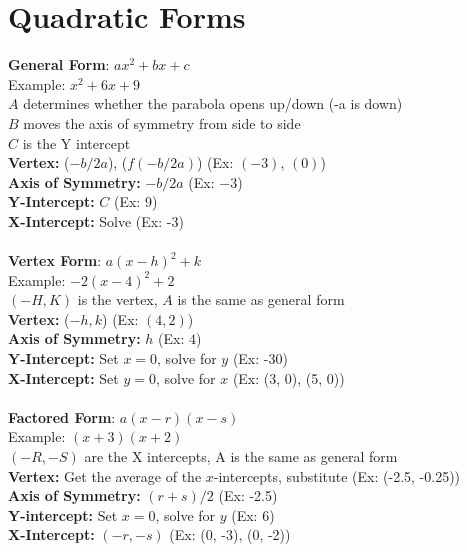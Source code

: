\documentclass{article}
\begin{document}
	\section*{Quadratic Forms}
	\textbf{General Form}: $ax^2 + bx + c$ \\
	Example: $x^2 + 6x + 9$ \\
	\textbf{$A$} determines whether the parabola opens up/down (-a is down)\\
	\textbf{$B$} moves the axis of symmetry from side to side\\
	\textbf{$C$} is the Y intercept\\ 
	\textbf{Vertex:} ($-b/2a$), ($f(-b/2a)$) (Ex: $(-3)$, $(0)$) \\
	\textbf{Axis of Symmetry:} $-b/2a$ (Ex: $-3$)\\
	\textbf{Y-Intercept:} $C$ (Ex: 9)\\
	\textbf{X-Intercept:} Solve (Ex: -3)\\ \\
	\textbf{Vertex Form}: $a(x-h)^2+k$ \\
	Example: $-2(x-4)^{2}+2$\\
	$(-H, K)$ is the vertex, $A$ is the same as general form \\ 
	\textbf{Vertex:} ($-h, k$) (Ex: $(4, 2)$)\\
	\textbf{Axis of Symmetry:} $h$ (Ex: $4$)\\
	\textbf{Y-Intercept:} Set $x=0$, solve for $y$ (Ex: -30) \\
	\textbf{X-Intercept:} Set $y=0$, solve for $x$ (Ex: (3, 0), (5, 0))\\ \\
	\textbf{Factored Form}: $a(x-r)(x-s)$ \\
	Example: $(x+3)(x+2)$ \\
	$(-R, -S)$ are the X intercepts, A is the same as general form \\ 
	\textbf{Vertex:} Get the average of the $x$-intercepts, substitute (Ex: (-2.5, -0.25))\\
	\textbf{Axis of Symmetry:} $(r+s)/2$ (Ex: -2.5)\\
	\textbf{Y-intercept:} Set $x=0$, solve for $y$ (Ex: 6)\\
	\textbf{X-Intercept:} $(-r, -s)$ (Ex: (0, -3), (0, -2)) 
\end{document}
